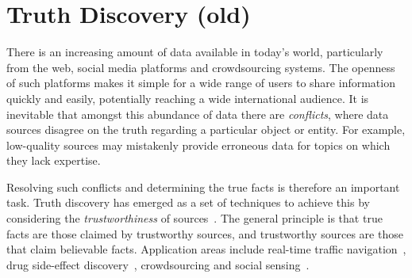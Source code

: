 \chapter{Truth Discovery (old)}
\label{chapter_td}


There is an increasing amount of data available in today's world, particularly
from the web, social media platforms and crowdsourcing systems. The openness of
such platforms makes it simple for a wide range of users to share information
quickly and easily, potentially reaching a wide international audience. It is
inevitable that amongst this abundance of data there are \emph{conflicts},
where data sources disagree on the truth regarding a particular object or
entity. For example, low-quality sources may mistakenly provide erroneous data
for topics on which they lack expertise.

Resolving such conflicts and determining the true facts is therefore an
important task. Truth discovery has emerged as a set of techniques to achieve
this by considering the \emph{trustworthiness} of
sources~\cite{li_survey_2016,gupta2011survey,berti2015veracity}. The general principle is that
true facts are those claimed by trustworthy sources, and trustworthy sources
are those that claim believable facts. Application areas include real-time
traffic navigation~\cite{du2019}, drug side-effect discovery~\cite{ma2017},
crowdsourcing and social
sensing~\cite{zhang_robust_2016,wang_truth_2012,ma_faitcrowd_2015}.





